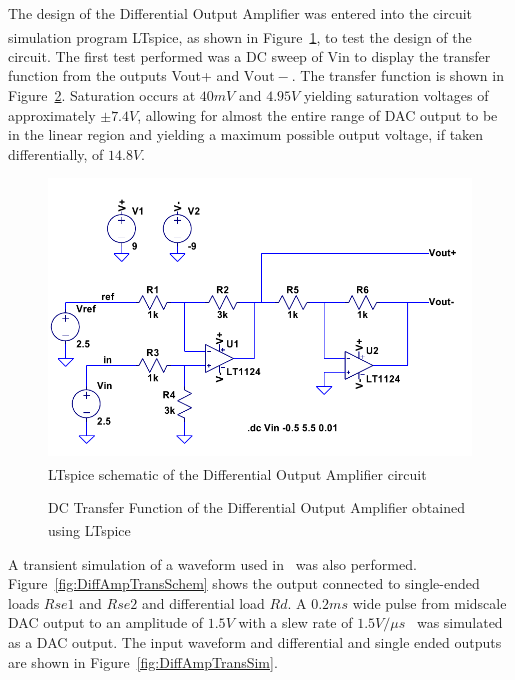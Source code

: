 The design of the Differential Output Amplifier was entered into the circuit simulation program LTspice\textsuperscript{\textregistered}, as shown in Figure~\ref{fig:DiffAmp}, to test the design of the circuit.  The first test performed was a DC sweep of Vin to display the transfer function from the outputs Vout+ and $\mathrm{Vout-}$.  The transfer function is shown in Figure~\ref{fig:DCSweep}.  Saturation occurs at $40\unit{mV}$ and $4.95\unit{V}$ yielding saturation voltages of approximately $\pm7.4\unit{V}$, allowing for almost the entire range of DAC output to be in the linear region and yielding a maximum possible output voltage, if taken differentially, of $14.8\unit{V}$.

\begin{figure}[H]
	\centering 
		\includegraphics{./figures/LTSchem} 
	\caption{LTspice\textsuperscript{\textregistered} schematic of the Differential Output Amplifier circuit\label{fig:DiffAmp}}
\end{figure}

\begin{figure}[H]
	\centering 
		\resizebox{\textwidth-0.5in}{!}{}
	\caption{DC Transfer Function of the Differential Output Amplifier obtained using LTspice\textsuperscript{\textregistered}\label{fig:DCSweep}}
\end{figure}

A transient simulation of a waveform used in~\cite{Olivo} was also performed.  Figure~\ref{fig:DiffAmpTransSchem} shows the output connected to single-ended loads $Rse1$ and $Rse2$ and differential load $Rd$.  A $0.2\unit{ms}$ wide pulse from midscale DAC output to an amplitude of $1.5\unit{V}$ with a slew rate of $1.5\unit{V}/ \unit{\mu s}$~\cite{AD5678ds} was simulated as a DAC output.  The input waveform and differential and single ended outputs are shown in Figure~\ref{fig:DiffAmpTransSim}.

